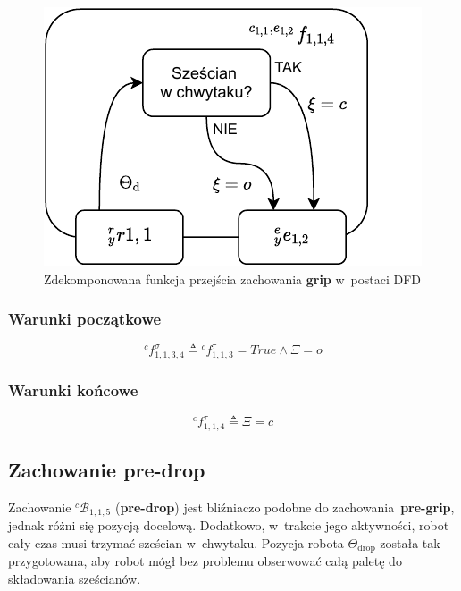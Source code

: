 \begin{figure}[H]
    \centering
    \includegraphics[width=\columnwidth]{figures/ISR-cs-fp-grip.pdf}
    \caption{Zdekomponowana funkcja przejścia zachowania \textbf{grip} w~postaci DFD}
    \label{fig:cs-fp-grip}
\end{figure}

\subsubsection{Warunki początkowe}
\begin{equation}
    {}^{c}f^{\sigma}_{1,1,3,4} \triangleq {}^{c}f^{\tau}_{1,1,3} = True \land \Xi = o
\end{equation}

\subsubsection{Warunki końcowe}
\begin{equation}
    {}^{c}f^{\tau}_{1,1,4} \triangleq \Xi = c
\end{equation}


\subsection{Zachowanie pre-drop}
\label{subsec:cs-pre-drop}
Zachowanie ${}^{c}\mathcal{B}_{1,1,5}$ (\textbf{pre-drop}) jest bliźniaczo podobne do zachowania~\textbf{pre-grip}, jednak różni się pozycją docelową. Dodatkowo, w~trakcie jego aktywności, robot cały czas musi trzymać sześcian w~chwytaku. Pozycja robota $\Theta_{\mathrm{drop}}$ została tak przygotowana, aby robot mógł bez problemu obserwować całą paletę do składowania sześcianów.

